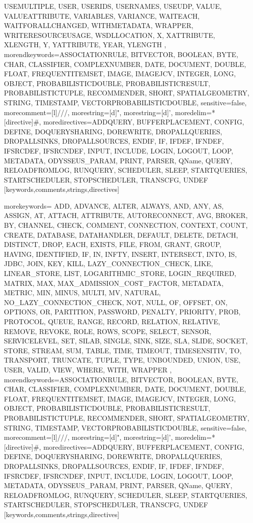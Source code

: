 {{USEMULTIPLE, USER, USERIDS, USERNAMES, USEUDP, VALUE, VALUEATTRIBUTE, VARIABLES, VARIANCE, WAITEACH, WAITFORALLCHANGED, WITHMETADATA, WRAPPER, WRITERESOURCEUSAGE, WSDLLOCATION, X, XATTRIBUTE, XLENGTH, Y, YATTRIBUTE, YEAR, YLENGTH%
      },%
   morendkeywords={ASSOCIATIONRULE, BITVECTOR, BOOLEAN, BYTE, CHAR, CLASSIFIER, COMPLEXNUMBER, DATE, DOCUMENT, DOUBLE, FLOAT, FREQUENTITEMSET, IMAGE, IMAGEJCV, INTEGER, LONG, OBJECT, PROBABILISTICDOUBLE, PROBABILISTICRESULT, PROBABILISTICTUPLE, RECOMMENDER, SHORT, SPATIALGEOMETRY, STRING, TIMESTAMP, VECTORPROBABILISTICDOUBLE},%
   sensitive=false,
   morecomment=[l]///,%
   morestring=[d]",%
   morestring=[d]',%
   moredelim=*[directive]\#,%
   moredirectives={ADDQUERY, BUFFERPLACEMENT, CONFIG, DEFINE, DOQUERYSHARING, DOREWRITE, DROPALLQUERIES, DROPALLSINKS, DROPALLSOURCES, ENDIF, IF, IFDEF, IFNDEF, IFSRCDEF, IFSRCNDEF, INPUT, INCLUDE, LOGIN, LOGOUT, LOOP, METADATA, ODYSSEUS_PARAM, PRINT, PARSER, QName, QUERY, RELOADFROMLOG, RUNQUERY, SCHEDULER, SLEEP, STARTQUERIES, STARTSCHEDULER, STOPSCHEDULER, TRANSCFG, UNDEF}%
}[keywords,comments,strings,directives]

%
   {morekeywords={%
ADD, ADVANCE, ALTER, ALWAYS, AND, ANY, AS, ASSIGN, AT, ATTACH, ATTRIBUTE, AUTORECONNECT, AVG, BROKER, BY, CHANNEL, CHECK, COMMENT, CONNECTION, CONTEXT, COUNT, CREATE, DATABASE, DATAHANDLER, DEFAULT, DELETE, DETACH, DISTINCT, DROP, EACH, EXISTS, FILE, FROM, GRANT, GROUP, HAVING, IDENTIFIED, IF, IN, INFTY, INSERT, INTERSECT, INTO, IS, JDBC, JOIN, KEY, KILL, LAZY_CONNECTION_CHECK, LIKE, LINEAR_STORE, LIST, LOGARITHMIC_STORE, LOGIN_REQUIRED, MATRIX, MAX, MAX_ADMISSION_COST_FACTOR, METADATA, METRIC, MIN, MINUS, MULTI, MV, NATURAL, NO_LAZY_CONNECTION_CHECK, NOT, NULL, OF, OFFSET, ON, OPTIONS, OR, PARTITION, PASSWORD, PENALTY, PRIORITY, PROB, PROTOCOL, QUEUE, RANGE, RECORD, RELATION, RELATIVE, REMOVE, REVOKE, ROLE, ROWS, SCOPE, SELECT, SENSOR, SERVICELEVEL, SET, SILAB, SINGLE, SINK, SIZE, SLA, SLIDE, SOCKET, STORE, STREAM, SUM, TABLE, TIME, TIMEOUT, TIMESENSITIV, TO, TRANSPORT, TRUNCATE, TUPLE, TYPE, UNBOUNDED, UNION, USE, USER, VALID, VIEW, WHERE, WITH, WRAPPER%
      },%
   morendkeywords={ASSOCIATIONRULE, BITVECTOR, BOOLEAN, BYTE, CHAR, CLASSIFIER, COMPLEXNUMBER, DATE, DOCUMENT, DOUBLE, FLOAT, FREQUENTITEMSET, IMAGE, IMAGEJCV, INTEGER, LONG, OBJECT, PROBABILISTICDOUBLE, PROBABILISTICRESULT, PROBABILISTICTUPLE, RECOMMENDER, SHORT, SPATIALGEOMETRY, STRING, TIMESTAMP, VECTORPROBABILISTICDOUBLE},%
   sensitive=false,
   morecomment=[l]///,%
   morestring=[d]",%
   morestring=[d]',%
   moredelim=*[directive]\#,%
   moredirectives={ADDQUERY, BUFFERPLACEMENT, CONFIG, DEFINE, DOQUERYSHARING, DOREWRITE, DROPALLQUERIES, DROPALLSINKS, DROPALLSOURCES, ENDIF, IF, IFDEF, IFNDEF, IFSRCDEF, IFSRCNDEF, INPUT, INCLUDE, LOGIN, LOGOUT, LOOP, METADATA, ODYSSEUS_PARAM, PRINT, PARSER, QName, QUERY, RELOADFROMLOG, RUNQUERY, SCHEDULER, SLEEP, STARTQUERIES, STARTSCHEDULER, STOPSCHEDULER, TRANSCFG, UNDEF}%
}[keywords,comments,strings,directives]

